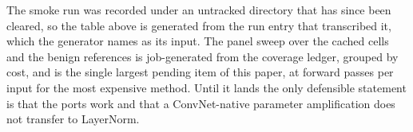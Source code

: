 \documentclass[../main.tex]{subfiles}
\begin{document}



The smoke run was recorded under an untracked directory that has since been cleared, so the table above is generated from the run entry that transcribed it, which the generator names as its input. The panel sweep over the cached cells and the benign references is job-generated from the coverage ledger, grouped by cost, and is the single largest pending item of this paper, at \CdLPasses{} forward passes per input for the most expensive method. Until it lands the only defensible statement is that the ports work and that a ConvNet-native parameter amplification does not transfer to LayerNorm.
\end{document}
